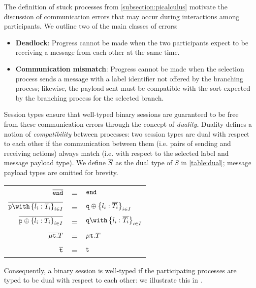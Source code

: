 The definition of stuck processes 
from \cref{subsection:picalculus} 
motivate the discussion of communication errors 
that may occur during interactions among participants. 
We outline two of the main classes of errors:

\begin{itemize}
\item \textbf{Deadlock}: 
Progress cannot be made when the two participants 
expect to be receiving a message from each other at the same time.
\item \textbf{Communication mismatch}: 
Progress cannot be made when the selection process 
sends a message with a label identifier not 
offered by the branching process; 
likewise, the payload sent must be compatible 
with the sort expected by the branching process 
for the selected branch.
\end{itemize}

Session types ensure that 
well-typed binary sessions are guaranteed 
to be free from these communication errors 
through the concept of \textit{duality}. 
Duality defines a notion of \textit{compatibility}
 between processes: two session types are dual 
 with respect to each other if the communication 
 between them (i.e. pairs of sending and receiving actions)
 always match (i.e. with respect to the selected label 
 and message payload type). 
We define $\overline{S}$ as the dual type of $S$ in \cref{table:dual};
message payload types are omitted for brevity.

\renewcommand{\arraystretch}{1.6}
\begin{center}
\begin{tabular}{rcl}
$\overline{\textnormal{\texttt{end}}}$ & = & $\textnormal{\texttt{end}}$ \\
$\dual{\tbra{p}{l_i: T_i}{i\in I}}$ & = & 
	${\mathtt{q}} \oplus \left\{ {l_i: \overline{T_i}} \right\}_{i\in I}$ \\
$\overline{{\mathtt{p}} \oplus \left\{ {l_i: T_i} \right\}_{i\in I}}$ & = & 
	$\tbra{q}{l_i: \dual{T_i}}{i\in I}$ \\
$\overline{\mu\textnormal{\texttt{t}}.{T}}$ & = & $\mu\textnormal{\texttt{t}}.{\overline{T}}$ \\
$\overline{\textnormal{\texttt{t}}}$ & = & $\textnormal{\texttt{t}}$ \\ 
\end{tabular}
\label{table:dual}
\end{center}
\renewcommand{\arraystretch}{1}

Consequently, a binary session is well-typed 
if the participating processes are typed to be 
dual with respect to each other: 
we illustrate this in .

